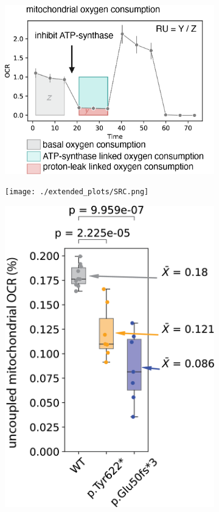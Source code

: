 \begin{figure}[H]
\begin{subfigure}[t]{0.33\textwidth}
        \includegraphics[width=\textwidth]{./main_plots/seahorse_cartoon.png}        
    \end{subfigure}  
    \begin{subfigure}[t]{0.25\textwidth}
        \caption{}
        \texttt{[image: ./extended\_plots/SRC.png]}        
    \end{subfigure} 
    \begin{subfigure}[t]{0.25\textwidth}
        \caption{}
        \includegraphics[width=\textwidth]{./extended_plots/uncoupling_quantification_batch1.png}        

\end{subfigure}
\end{figure}
